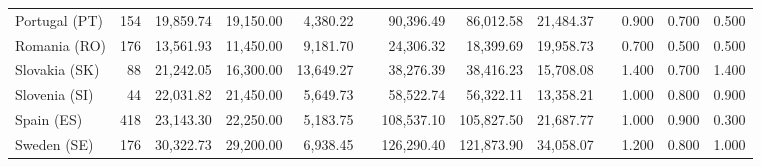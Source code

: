 \documentclass[a4paper,11pt,oneside]{article}
\begin{document}
\begin{table}
{\begin{tabular}{lrrrrrrrrrrrr}
Portugal (PT)        & 154     & 19,859.74  & 19,150.00  & 4,380.22   &  & 90,396.49   & 86,012.58   & 21,484.37  &  & 0.900  & 0.700  & 0.500  \\
Romania (RO)         & 176     & 13,561.93  & 11,450.00  & 9,181.70   &  & 24,306.32   & 18,399.69   & 19,958.73  &  & 0.700  & 0.500  & 0.500  \\
Slovakia (SK)        & 88      & 21,242.05  & 16,300.00  & 13,649.27  &  & 38,276.39   & 38,416.23   & 15,708.08  &  & 1.400  & 0.700  & 1.400  \\
Slovenia (SI)        & 44      & 22,031.82  & 21,450.00  & 5,649.73   &  & 58,522.74   & 56,322.11   & 13,358.21  &  & 1.000  & 0.800  & 0.900  \\
Spain (ES)           & 418     & 23,143.30  & 22,250.00  & 5,183.75   &  & 108,537.10  & 105,827.50  & 21,687.77  &  & 1.000  & 0.900  & 0.300  \\
Sweden (SE)          & 176     & 30,322.73  & 29,200.00  & 6,938.45   &  & 126,290.40  & 121,873.90  & 34,058.07  &  & 1.200  & 0.800  & 1.000  \\
\bottomrule
\end{tabular}
}
\end{table}




\pagebreak
\clearpage













\end{document}
